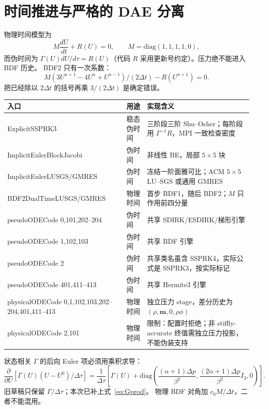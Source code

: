 \documentclass[UTF8,11pt,a4paper]{ctexart}
\newcommand{\warn}{\textcolor{Warn}{限制}}\newcommand{\vect}[1]{\bm{#1}}
\begin{document}
\section{时间推进与严格的 DAE 分离}
物理时间模型为
\begin{equation}
M\frac{dU}{dt}+R(U)=0,\qquad M=\mathrm{diag}(1,1,1,1,0),\label{eq:M}
\end{equation}
而伪时间为 $\Gamma(U)dU/d\tau=R(U)$（代码 $R$ 采用更新号约定）。压力绝不能进入 BDF 历史。
BDF2 只有一次系数：
\begin{equation}M(3U^{n+1}-4U^n+U^{n-1})/(2\Delta t)-R(U^{n+1})=0.\end{equation}
把已经除以 $2\Delta t$ 的括号再乘 $3/(2\Delta t)$ 是确定错误。

\begin{longtable}{p{.25\linewidth}p{.19\linewidth}p{.48\linewidth}}
\toprule 入口&用途&实现含义\\\midrule
ExplicitSSPRK3&稳态伪时间&三阶段三阶 Shu--Osher；每阶段用 $\Gamma^{-1}R$，MPI 一致检查密度\\
ImplicitEulerBlockJacobi&伪时间&非线性 BE，局部 $5\times5$ 块\\
ImplicitEulerLUSGS/GMRES&伪时间&冻结一阶面雅可比；ACM $5\times5$ LU--SGS 或通用 GMRES\\
BDF2DualTimeLUSGS/GMRES&物理时间&首步 BDF1，随后 BDF2；$M$ 只作用前四分量\\
pseudoODECode 0,101,202--204&伪时间&共享 SDIRK/ESDIRK/梯形引擎\\
pseudoODECode 1,102,103&伪时间&共享 BDF 引擎\\
pseudoODECode 2&伪时间&共享类名虽含 SSPRK4，实际公式是 SSPRK3，按实际标记\\
pseudoODECode 401,411--413&伪时间&共享 Hermite3 引擎\\
physicalODECode 0,1,102,103,202--204,401,411--413&物理时间&独立压力 stage，差分历史为 $(\rho,\vect m,0,\rho\phi)$\\
physicalODECode 2,101&物理时间&\warn：配置时拒绝；非 stiffly-accurate 终值需独立压力投影，不能伪装支持\\
\bottomrule
\end{longtable}

状态相关 $\Gamma$ 的后向 Euler 项必须用乘积求导：
\begin{equation}
\frac{\partial}{\partial U}\left[\Gamma(U)(U-U^0)/\Delta\tau\right]
=\frac1{\Delta\tau}\left[\Gamma(U)+
\mathrm{diag}\left(\frac{(\alpha+1)\Delta p}{\beta^2},
\frac{(2\alpha+1)\Delta p}{\beta^2}I_3,0\right)\right].\label{eq:Gprod}
\end{equation}
旧草稿只保留 $\Gamma/\Delta\tau$；本次已补上式~\eqref{eq:Gprod}。
物理 BDF 对角加 $c_0M/\Delta t$，二者不能混用。
\end{document}
